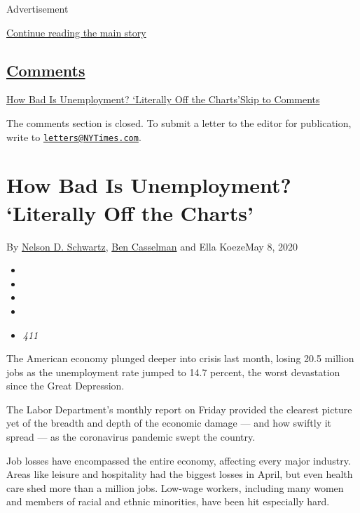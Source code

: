 Advertisement

\protect\hyperlink{after-top}{Continue reading the main story}

\hypertarget{comments}{%
\subsection{\texorpdfstring{\protect\hyperlink{commentsContainer}{Comments}}{Comments}}\label{comments}}

\href{}{How Bad Is Unemployment? `Literally Off the Charts'}\href{}{Skip
to Comments}

The comments section is closed. To submit a letter to the editor for
publication, write to
\href{mailto:letters@NYTimes.com}{\nolinkurl{letters@NYTimes.com}}.

\hypertarget{how-bad-is-unemployment-literally-off-the-charts}{%
\section{How Bad Is Unemployment? `Literally Off the
Charts'}\label{how-bad-is-unemployment-literally-off-the-charts}}

By \href{https://www.nytimes3xbfgragh.onion/by/nelson-d-schwartz}{Nelson
D. Schwartz},
\href{https://www.nytimes3xbfgragh.onion/by/ben-casselman}{Ben
Casselman} and Ella KoezeMay 8, 2020

\begin{itemize}
\item
\item
\item
\item
\item
  \emph{411}
\end{itemize}

The American economy plunged deeper into crisis last month, losing 20.5
million jobs as the unemployment rate jumped to 14.7 percent, the worst
devastation since the Great Depression.

The Labor Department's monthly report on Friday provided the clearest
picture yet of the breadth and depth of the economic damage --- and how
swiftly it spread --- as the coronavirus pandemic swept the country.

Job losses have encompassed the entire economy, affecting every major
industry. Areas like leisure and hospitality had the biggest losses in
April, but even health care shed more than a million jobs. Low-wage
workers, including many women and members of racial and ethnic
minorities, have been hit especially hard.

